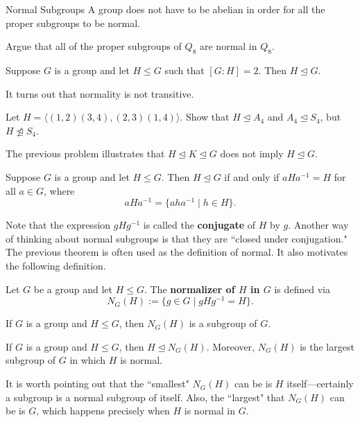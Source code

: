\begin{section}{Normal Subgroups}
A group does not have to be abelian in order for all the proper subgroups to be normal.

\begin{problem}
Argue that all of the proper subgroups of $Q_8$ are normal in $Q_8$. 
\end{problem}

\begin{theorem}
Suppose $G$ is a group and let $H\leq G$ such that $[G:H]=2$.  Then $H\trianglelefteq G$.
\end{theorem}

It turns out that normality is not transitive.

\begin{problem}
Let $H=\langle (1,2)(3,4),(2,3)(1,4)\rangle$.  Show that $H\trianglelefteq A_4$ and $A_4\trianglelefteq S_4$, but $H\not\trianglelefteq S_4$.
\end{problem}

The previous problem illustrates that $H\trianglelefteq K \trianglelefteq G$ does not imply $H\trianglelefteq G$.

\begin{theorem}
Suppose $G$ is a group and let $H\leq G$.  Then $H\trianglelefteq G$ if and only if $aHa^{-1}=H$ for all $a\in G$, where
\[
aHa^{-1}=\{aha^{-1}\mid h\in H\}.
\]
\end{theorem}

Note that the expression $gHg^{-1}$ is called the \textbf{conjugate} of $H$ by $g$.  Another way of thinking about normal subgroups is that they are ``closed under conjugation." The previous theorem is often used as the definition of normal.  It also motivates the following definition.

\begin{definition}
Let $G$ be a group and let $H\leq G$.  The \textbf{normalizer of $H$ in $G$} is defined via
\[
N_G(H):=\{g\in G\mid gHg^{-1}=H\}.
\]
\end{definition}

\begin{theorem}
If $G$ is a group and $H\leq G$, then $N_G(H)$ is a subgroup of $G$.
\end{theorem}

\begin{theorem}
If $G$ is a group and $H\leq G$, then $H\trianglelefteq N_G(H)$.  Moreover, $N_G(H)$ is the largest subgroup of $G$ in which $H$ is normal. 
\end{theorem}

It is worth pointing out that the ``smallest" $N_G(H)$ can be is $H$ itself---certainly a subgroup is a normal subgroup of itself.  Also, the ``largest" that $N_G(H)$ can be is $G$, which happens precisely when $H$ is normal in $G$.


\end{section}
